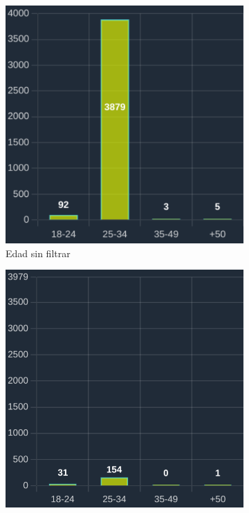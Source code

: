 \begin{figure}[H]
  \centering
  \begin{subfigure}{0.3\textwidth}
   \includegraphics[width=\textwidth]{imaxes/capturas-app/graficos/grivas/grafico-edad-grivas.png}
  \caption{Edad sin filtrar} 
  \end{subfigure}
  \begin{subfigure}{0.3\textwidth}
   \includegraphics[width=\textwidth]{imaxes/capturas-app/graficos/grivas/grafico-edad-grivas-femenino2.png}

\end{subfigure}
\end{figure}
